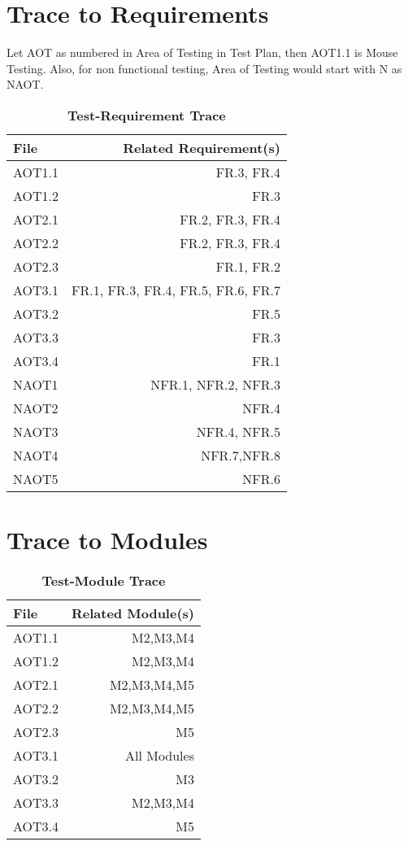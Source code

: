 \documentclass[12pt, titlepage]{article}
\begin{document}
\section{Trace to Requirements}
Let AOT as numbered in Area of Testing in Test Plan, then AOT1.1 is Mouse Testing. Also, for non functional testing, Area of Testing would start with N as NAOT.\\
\newpage
\begin{table}
		\caption{\bf Test-Requirement Trace}
		\centering
		\bigskip
		\def\arraystretch{1.04}
		\begin{tabular}{l r}
			\toprule
			\bf File & \bf Related Requirement(s)\\
			\midrule
			AOT1.1			& FR.3, FR.4\\
			AOT1.2			& FR.3\\
			AOT2.1 		& FR.2, FR.3, FR.4\\
			AOT2.2		& FR.2, FR.3, FR.4\\
			AOT2.3	& FR.1, FR.2\\
			AOT3.1		& FR.1, FR.3, FR.4, FR.5, FR.6, FR.7\\
			AOT3.2	& FR.5\\
			AOT3.3 			& FR.3\\
		    AOT3.4 		& FR.1\\
			NAOT1 			& NFR.1, NFR.2, NFR.3\\
			NAOT2 		& NFR.4\\
			NAOT3 		& NFR.4, NFR.5\\
			NAOT4  	& NFR.7,NFR.8\\
			NAOT5 		& NFR.6\\
			\hline
		\end{tabular}
	\end{table}

\section{Trace to Modules}
\newpage
\begin{table}
		\caption{\bf Test-Module Trace}
		\centering
		\bigskip
		\def\arraystretch{1.04}
		\begin{tabular}{l r}
			\toprule
			\bf File & \bf Related Module(s)\\
			\midrule
			AOT1.1			& M2,M3,M4\\
			AOT1.2			& M2,M3,M4\\
			AOT2.1 		& M2,M3,M4,M5\\
			AOT2.2		& M2,M3,M4,M5\\
			AOT2.3	& M5\\
			AOT3.1		& All Modules\\
			AOT3.2	& M3\\
			AOT3.3 			& M2,M3,M4\\
		    AOT3.4 		& M5\\
			\hline
		\end{tabular}
	\end{table}
	\\\\\\
\end{document}
